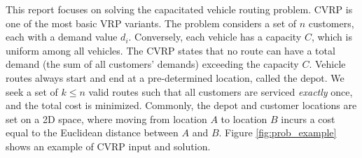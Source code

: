 \documentclass{report}
\begin{document}
This report focuses on solving the capacitated vehicle routing problem. CVRP is one of the most basic VRP variants. The problem considers a set of $n$ customers, each with a demand value $d_i$. Conversely, each vehicle has a capacity $C$, which is uniform among all vehicles. The CVRP states that no route can have a total demand (the sum of all customers' demands) exceeding the capacity $C$. Vehicle routes always start and end at a pre-determined location, called the depot. We seek a set of $k \leq n$ valid routes such that all customers are serviced \textit{exactly} once, and the total cost is minimized. Commonly, the depot and customer locations are set on a 2D space, where moving from location $A$ to location $B$ incurs a cost equal to the Euclidean distance between $A$ and $B$. Figure \ref{fig:prob_example} shows an example of CVRP input and solution.
\end{document}
